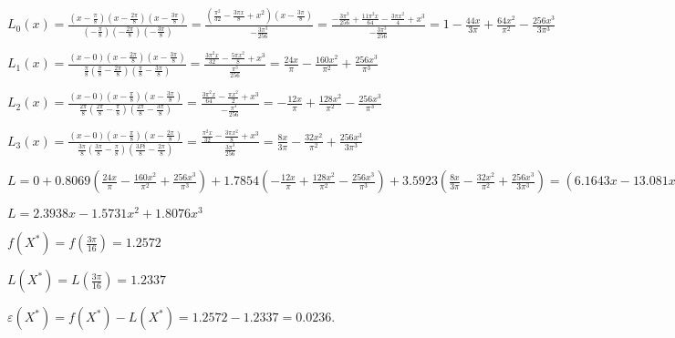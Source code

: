 \documentclass[10pt, a4paper]{scrartcl}
\begin{document}
\vspace{10mm}

\(\displaystyle L_0(x) = \frac{(x - \frac{\pi}{8}) (x - \frac{2\pi}{8}) (x - \frac{3\pi}{8})}{(-\frac{\pi}{8})(-\frac{2\pi}{8})(-\frac{3\pi}{8})} = \frac{(\frac{\pi ^2}{32}-\frac{3 \pi x}{8}+x^2)(x - \frac{3\pi}{8})}{-\frac{3 \pi ^3}{256}} = \frac{-\frac{3 \pi ^3}{256}+\frac{11 \pi ^2 x}{64}-\frac{3 \pi x^2}{4}+x^3}{-\frac{3 \pi ^3}{256}} = 1-\frac{44 x}{3 \pi }+\frac{64 x^2}{\pi ^2}-\frac{256 x^3}{3 \pi ^3}\)

\(\displaystyle L_1(x) = \frac{(x - 0) (x - \frac{2 \pi}{8}) (x - \frac{3 \pi}{8})}{\frac{\pi}{8} (\frac{\pi}{8} - \frac{2 \pi}{8}) (\frac{\pi}{8} - \frac{3 \pi}{8})} = \frac{\frac{3 \pi ^2 x}{32}-\frac{5 \pi x^2}{8}+x^3}{\frac{\pi ^3}{256}} = \frac{24 x}{\pi }-\frac{160 x^2}{\pi ^2}+\frac{256 x^3}{\pi ^3}\)

\(\displaystyle L_2(x) = \frac{(x - 0)(x - \frac{\pi}{8})(x - \frac{3 \pi}{8})}{\frac{2 \pi}{8}(\frac{2 \pi}{8} - \frac{\pi}{8})(\frac{2 \pi}{8} - \frac{3 \pi}{8})} = \frac{\frac{3 \pi ^2 x}{64}-\frac{\pi x^2}{2}+x^3}{-\frac{\pi ^3}{256}} = -\frac{12 x}{\pi }+\frac{128 x^2}{\pi ^2}-\frac{256 x^3}{\pi ^3}\)

\(\displaystyle L_3(x) = \frac{(x - 0) (x - \frac{\pi}{8}) (x - \frac{2 \pi}{8})}{\frac{3 \pi}{8}(\frac{3 \pi}{8} - \frac{\pi}{8})(\frac{3 Pi}{8} - \frac{2 \pi}{8})} = \frac{\frac{\pi ^2 x}{32}-\frac{3 \pi x^2}{8}+x^3}{\frac{3 \pi ^3}{256}} = \frac{8 x}{3 \pi }-\frac{32 x^2}{\pi ^2}+\frac{256 x^3}{3 \pi ^3}\)

\(\displaystyle L = 0 + 0.8069(\frac{24 x}{\pi }-\frac{160 x^2}{\pi ^2}+\frac{256 x^3}{\pi ^3}) + 1.7854(-\frac{12 x}{\pi }+\frac{128 x^2}{\pi ^2}-\frac{256 x^3}{\pi ^3}) + 3.5923(\frac{8 x}{3 \pi }-\frac{32 x^2}{\pi ^2}+\frac{256 x^3}{3 \pi ^3}) = (6.1643 x-13.081 x^2+6.6621 x^3) + (-6.8197 x+23.1551 x^2-14.741 x^3) + (3.0492 x-11.6472 x^2+9.8865 x^3)\)

\(\displaystyle L = 2.3938 x-1.5731 x^2+1.8076 x^3\)

\vspace{5mm}

\(\displaystyle f(X^{*}) = f(\frac{3\pi}{16}) = 1.2572\)

\(\displaystyle L(X^{*}) = L(\frac{3\pi}{16}) = 1.2337\)

\(\displaystyle \varepsilon(X^{*}) = f(X^{*}) - L(X^{*}) = 1.2572 - 1.2337 = 0.0236.\)

\vspace{10mm}
\end{document}
